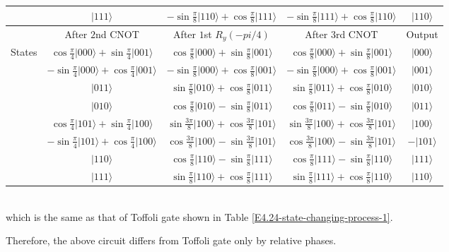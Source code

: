 \documentclass[en]{sol-man}
\begin{document}
\begin{pf}
\begin{table}[h]
\begin{tabular}{|c|c|c|c|c|}
             & $\lvert 111\rangle$ & $-\sin\frac{\pi}{8}\lvert 110\rangle+\cos\frac{\pi}{8}\lvert 111\rangle$ & $-\sin\frac{\pi}{8}\lvert 111\rangle+\cos\frac{\pi}{8}\lvert 110\rangle$ & $\lvert 110\rangle$ \\ \hline\hline
             & After $2$nd CNOT & After $1$st $R_y(-pi/4)$ & After $3$rd CNOT & Output \\ \hline
            \multirow{8}{*}{States} & $\cos\frac{\pi}{4}\lvert 000\rangle+\sin\frac{\pi}{4}\lvert 001\rangle$ & $\cos\frac{\pi}{8}\lvert 000\rangle+\sin\frac{\pi}{8}\lvert 001\rangle$ & $\cos\frac{\pi}{8}\lvert 000\rangle+\sin\frac{\pi}{8}\lvert 001\rangle$ & $\lvert 000\rangle$ \\ \cline{2-5} 
             & $-\sin\frac{\pi}{4}\lvert 000\rangle+\cos\frac{\pi}{4}\lvert 001\rangle$ & $-\sin\frac{\pi}{8}\lvert 000\rangle+\cos\frac{\pi}{8}\lvert 001\rangle$ & $-\sin\frac{\pi}{8}\lvert 000\rangle+\cos\frac{\pi}{8}\lvert 001\rangle$ & $\lvert 001\rangle$ \\ \cline{2-5} 
             & $\lvert 011\rangle$ & $\sin\frac{\pi}{8}\lvert 010\rangle+\cos\frac{\pi}{8}\lvert 011\rangle$ & $\sin\frac{\pi}{8}\lvert 011\rangle+\cos\frac{\pi}{8}\lvert 010\rangle$ & $\lvert 010\rangle$ \\ \cline{2-5} 
             & $\lvert 010\rangle$ & $\cos\frac{\pi}{8}\lvert 010\rangle-\sin\frac{\pi}{8}\lvert 011\rangle$ & $\cos\frac{\pi}{8}\lvert 011\rangle-\sin\frac{\pi}{8}\lvert 010\rangle$ & $\lvert 011\rangle$ \\ \cline{2-5} 
             & $\cos\frac{\pi}{4}\lvert 101\rangle+\sin\frac{\pi}{4}\lvert 100\rangle$ & $\sin\frac{3\pi}{8}\lvert 100\rangle+\cos\frac{3\pi}{8}\lvert 101\rangle$ & $\sin\frac{3\pi}{8}\lvert 100\rangle+\cos\frac{3\pi}{8}\lvert 101\rangle$ & $\lvert 100\rangle$ \\ \cline{2-5} 
             & $-\sin\frac{\pi}{4}\lvert 101\rangle+\cos\frac{\pi}{4}\lvert 100\rangle$ & $\cos\frac{3\pi}{8}\lvert 100\rangle-\sin\frac{3\pi}{8}\lvert 101\rangle$ & $\cos\frac{3\pi}{8}\lvert 100\rangle-\sin\frac{3\pi}{8}\lvert 101\rangle$ & $-\lvert 101\rangle$ \\ \cline{2-5} 
             & $\lvert 110\rangle$ & $\cos\frac{\pi}{8}\lvert 110\rangle-\sin\frac{\pi}{8}\lvert 111\rangle$ & $\cos\frac{\pi}{8}\lvert 111\rangle-\sin\frac{\pi}{8}\lvert 110\rangle$ & $\lvert 111\rangle$ \\ \cline{2-5} 
             & $\lvert 111\rangle$ & $\sin\frac{\pi}{8}\lvert 110\rangle+\cos\frac{\pi}{8}\lvert 111\rangle$ & $\sin\frac{\pi}{8}\lvert 111\rangle+\cos\frac{\pi}{8}\lvert 110\rangle$ & $\lvert 110\rangle$ \\ \hline
            \end{tabular}
    \end{table}\\
    which is the same as that of Toffoli gate shown in Table \ref{E4.24-state-changing-process-1}.

    Therefore, the above circuit differs from Toffoli gate only by relative phases.
\end{pf}
\end{document}
